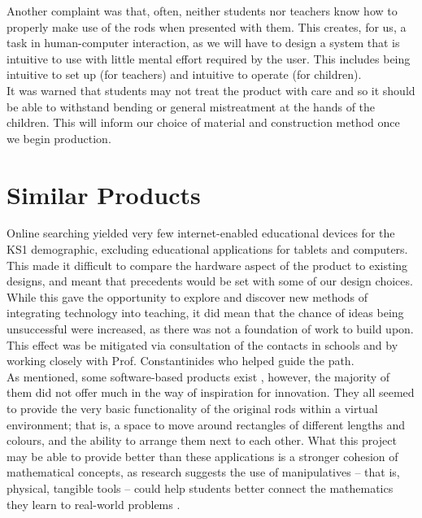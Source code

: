 Another complaint was that, often, neither students nor teachers know how to properly make use of the rods when presented with them. This creates, for us, a task in human-computer interaction, as we will have to design a system that is intuitive to use with little mental effort required by the user. This includes being intuitive to set up (for teachers) and intuitive to operate (for children).\\

It was warned that students may not treat the product with care and so it should be able to withstand bending or general mistreatment at the hands of the children. This will inform our choice of material and construction method once we begin production. \\


\section{Similar Products}
Online searching yielded very few internet-enabled educational devices for the KS1 demographic, excluding educational applications for tablets and computers. This made it difficult to compare the hardware aspect of the product to existing designs, and meant that precedents would be set with some of our design choices. While this gave the opportunity to explore and discover new methods of integrating technology into teaching, it did mean that the chance of ideas being unsuccessful were increased, as there was not a foundation of work to build upon. This effect was be mitigated via consultation of the contacts in schools and by working closely with Prof. Constantinides who  helped guide the path.\\


As mentioned, some software-based products exist \cite{nrichmat66:online} \cite{Relation85:online} \cite{Cuisenai37:online}, however, the majority of them did not offer much in the way of inspiration for innovation. They all seemed to provide the very basic functionality of the original rods within a virtual environment; that is, a space to move around rectangles of different lengths and colours, and the ability to arrange them next to each other. What this project may be able to provide better than these applications is a stronger cohesion of mathematical concepts, as research suggests the use of manipulatives -- that is, physical, tangible tools --  could help students better connect the mathematics they learn to real-world problems \cite{thomaspost1981}.



